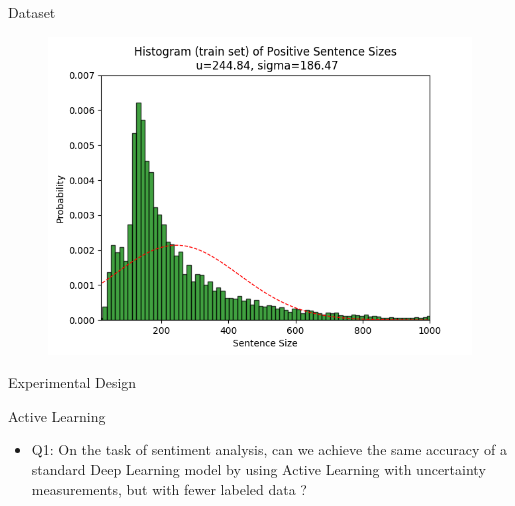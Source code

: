 \documentclass[10pt]{beamer}
\begin{document}
\begin{frame}[fragile]{Dataset}
    \begin{figure}[htp]
        \centering
        \includegraphics[scale=0.6]{images/train_positive_graph.png}
    \end{figure}
\end{frame}

\begin{frame}[fragile]{Experimental Design}
    
\end{frame}

\begin{frame}[fragile]{Active Learning}
    \begin{itemize}
        \item \alert{Q1}: On the task of sentiment analysis, can we achieve the same
            accuracy of a standard Deep Learning model by using Active Learning
            with uncertainty measurements, but with fewer labeled data ?
    \end{itemize}
\end{frame}
\end{document}
